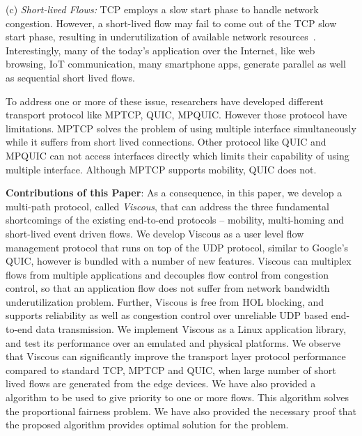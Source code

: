 (c) \textit{Short-lived Flows:} TCP employs a slow start phase to handle network congestion. However, a short-lived flow may fail to come out of the TCP slow start phase, resulting in underutilization of available network resources~\cite{de2016throughput}. Interestingly, many of the today's application over the Internet, like web browsing, IoT communication, many smartphone apps, generate parallel as well as sequential short lived flows. 

To address one or more of these issue, researchers have developed different transport protocol like MPTCP, QUIC, MPQUIC. However those protocol have limitations. MPTCP solves the problem of using multiple interface simultaneously while it suffers from short lived connections. Other protocol like QUIC and MPQUIC can not access interfaces directly which limits their capability of using multiple interface. Although MPTCP supports mobility, QUIC does not.

\textbf{Contributions of this Paper}:
As a consequence, in this paper, we develop a multi-path protocol, called {\em Viscous}, that can address the three fundamental shortcomings of the existing end-to-end protocols -- mobility, multi-homing and short-lived event driven flows. We develop Viscous as a user level flow management protocol that runs on top of the UDP protocol, similar to Google's QUIC, however is bundled with a number of new features. Viscous can multiplex flows from multiple applications and decouples flow control from congestion control, so that an application flow does not suffer from network bandwidth underutilization problem. Further, Viscous is free from HOL blocking, and supports reliability as well as congestion control over unreliable UDP based end-to-end data transmission. We implement Viscous as a Linux application library, and test its performance over an emulated and physical platforms. We observe that Viscous can significantly improve the transport layer protocol performance compared to standard TCP, MPTCP and QUIC, when large number of short lived flows are generated from the edge devices. We have also provided a algorithm to be used to give priority to one or more flows. This algorithm solves the proportional fairness problem. We have also provided the necessary proof that the proposed algorithm provides optimal solution for the problem.